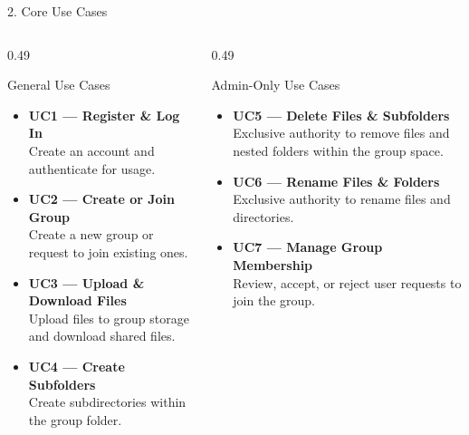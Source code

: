 \documentclass[t, aspectratio=169]{beamer}
\begin{document}
\begin{frame}{2. Core Use Cases}
\small
\begin{columns}[T]
\begin{column}{0.49\textwidth}
\begin{block}{General Use Cases}
\begin{itemize}
    \setlength{\itemsep}{5pt}
    \item \textbf{UC1 --- Register \& Log In}\\
    Create an account and authenticate for usage.
    \item \textbf{UC2 --- Create or Join Group}\\
    Create a new group or request to join existing ones.
    \item \textbf{UC3 --- Upload \& Download Files}\\
    Upload files to group storage and download shared files.
    \item \textbf{UC4 --- Create Subfolders}\\
    Create subdirectories within the group folder.
\end{itemize}
\end{block}
\end{column}
\begin{column}{0.49\textwidth}
\begin{block}{Admin-Only Use Cases}
\begin{itemize}
    \setlength{\itemsep}{6pt}
    \item \textbf{UC5 --- Delete Files \& Subfolders}\\
    Exclusive authority to remove files and nested folders within the group space.
    \item \textbf{UC6 --- Rename Files \& Folders}\\
    Exclusive authority to rename files and directories.
    \item \textbf{UC7 --- Manage Group Membership}\\
    Review, accept, or reject user requests to join the group.
\end{itemize}
\end{block}
\end{column}
\end{columns}
\end{frame}
\end{document}

